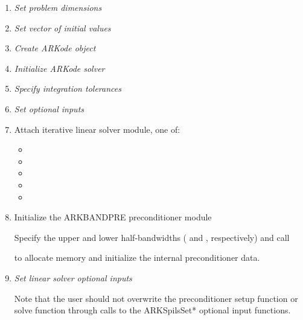 \documentclass[letterpaper,10pt,english]{sphinxmanual}
\begin{document}
\begin{enumerate}
\item {} 
\emph{Set problem dimensions}

\item {} 
\emph{Set vector of initial values}

\item {} 
\emph{Create ARKode object}

\item {} 
\emph{Initialize ARKode solver}

\item {} 
\emph{Specify integration tolerances}

\item {} 
\emph{Set optional inputs}

\item {} 
Attach iterative linear solver module, one of:
\begin{itemize}
\item {} 

\item {} 

\item {} 

\item {} 

\item {} 

\end{itemize}

\item {} 
Initialize the ARKBANDPRE preconditioner module

Specify the upper and lower half-bandwidths ( and ,
respectively) and call


to allocate memory and initialize the internal preconditioner
data.

\item {} 
\emph{Set linear solver optional inputs}

Note that the user should not overwrite the preconditioner setup
function or solve function through calls to the ARKSpilsSet*
optional input functions.

\end{enumerate}
\end{document}
